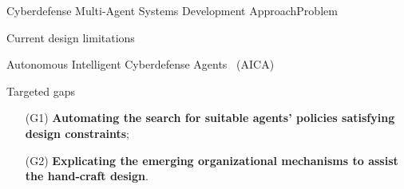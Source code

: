 \begin{frame}{Cyberdefense Multi-Agent Systems Development Approach}{Problem}
\begin{alertblock}{Current design limitations}
\begin{center}
\begin{minipage}{0.95\linewidth}
\begin{exampleblock}{Autonomous Intelligent Cyberdefense Agents~\cite{Kott2023} (AICA)}
                \end{exampleblock}
            \end{minipage}
        \end{center}

    \end{alertblock}

    \begin{alertblock}{Targeted gaps}
        \begin{enumerate}
            \item[\phantom{X} (G1)] \textbf{Automating the search for suitable agents' policies satisfying design constraints};
            \item[\phantom{X} (G2)] \textbf{Explicating the emerging organizational mechanisms to assist the hand-craft design}.
        \end{enumerate}
    \end{alertblock}

\end{frame}

